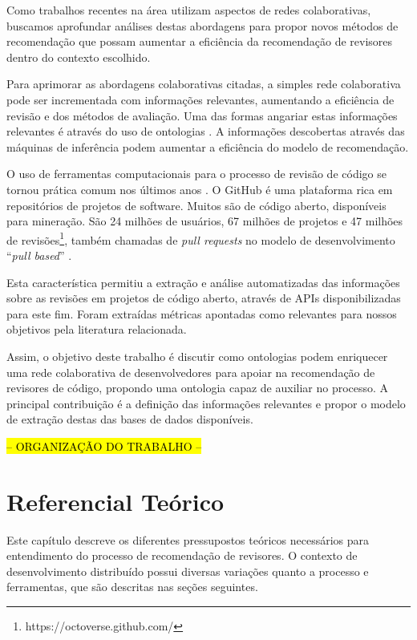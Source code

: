 \documentclass[a4paper,12pt]{monografia}
\theoremstyle{plain}
\theoremstyle{definition}
\theoremstyle{remark}
\begin{document}
Como trabalhos recentes na área utilizam aspectos de redes colaborativas, buscamos aprofundar análises destas abordagens para propor novos métodos de recomendação que possam aumentar a eficiência da recomendação de revisores dentro do contexto escolhido.

Para aprimorar as abordagens colaborativas citadas, a simples rede colaborativa pode ser incrementada com informações relevantes, aumentando a eficiência de revisão e dos métodos de avaliação. Uma das formas angariar estas informações relevantes é através do uso de ontologias \cite{middleton2001,middleton2004}. A informações descobertas através das máquinas de inferência podem aumentar a eficiência do modelo de recomendação.

O uso de ferramentas computacionais para o processo de revisão de código se tornou prática comum nos últimos anos \cite{Bacchelli2013}. O GitHub é uma plataforma rica em repositórios de projetos de software. Muitos são de código aberto, disponíveis para mineração. São 24 milhões de usuários, 67 milhões de projetos e 47 milhões de revisões\footnote{https://octoverse.github.com/}, também chamadas de \textit{pull requests} no modelo de desenvolvimento ``\textit{pull based}'' \cite{gousios2014}.

Esta característica permitiu a extração e análise automatizadas das informações sobre as revisões em projetos de código aberto, através de APIs disponibilizadas para este fim. Foram extraídas métricas apontadas como relevantes para nossos objetivos pela literatura relacionada.

Assim, o objetivo deste trabalho é discutir como ontologias podem enriquecer uma rede colaborativa de desenvolvedores para apoiar na recomendação de revisores de código, propondo uma ontologia capaz de auxiliar no processo. A principal contribuição é a definição das informações relevantes e propor o modelo de extração destas das bases de dados disponíveis.

\textcolor{red}{\hl{-- ORGANIZAÇÃO DO TRABALHO --}}

\chapter{Referencial Teórico}\label{cha:referencial}

Este capítulo descreve os diferentes pressupostos teóricos necessários para entendimento do processo de recomendação de revisores. O contexto de desenvolvimento distribuído possui diversas variações quanto a processo e ferramentas, que são descritas nas seções seguintes.
\end{document}
